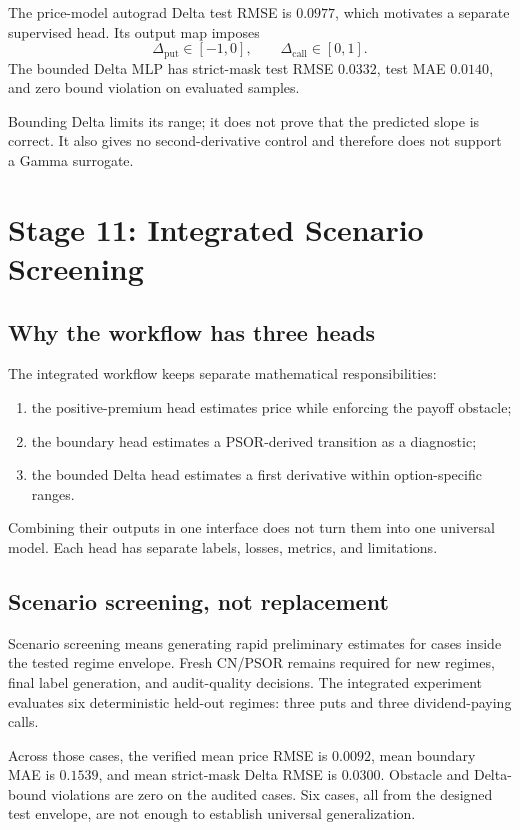 The price-model autograd Delta test RMSE is \(0.0977\), which motivates a
separate supervised head. Its output map imposes
\[
  \Delta_{\mathrm{put}}\in[-1,0],
  \qquad
  \Delta_{\mathrm{call}}\in[0,1].
\]
The bounded Delta MLP has strict-mask test RMSE \(0.0332\), test MAE \(0.0140\),
and zero bound violation on evaluated samples.

\begin{commonconfusion}
Bounding Delta limits its range; it does not prove that the predicted slope is
correct. It also gives no second-derivative control and therefore does not
support a Gamma surrogate.
\end{commonconfusion}

\section{Stage 11: Integrated Scenario Screening}

\subsection{Why the workflow has three heads}
The integrated workflow keeps separate mathematical responsibilities:
\begin{enumerate}
  \item the positive-premium head estimates price while enforcing the payoff
        obstacle;
  \item the boundary head estimates a PSOR-derived transition as a diagnostic;
  \item the bounded Delta head estimates a first derivative within
        option-specific ranges.
\end{enumerate}
Combining their outputs in one interface does not turn them into one universal
model. Each head has separate labels, losses, metrics, and limitations.

\subsection{Scenario screening, not replacement}
Scenario screening means generating rapid preliminary estimates for cases
inside the tested regime envelope. Fresh CN/PSOR remains required for new
regimes, final label generation, and audit-quality decisions. The integrated
experiment evaluates six deterministic held-out regimes: three puts and three
dividend-paying calls.

Across those cases, the verified mean price RMSE is \(0.0092\), mean boundary
MAE is \(0.1539\), and mean strict-mask Delta RMSE is \(0.0300\). Obstacle and
Delta-bound violations are zero on the audited cases. Six cases, all from the
designed test envelope, are not enough to establish universal generalization.

